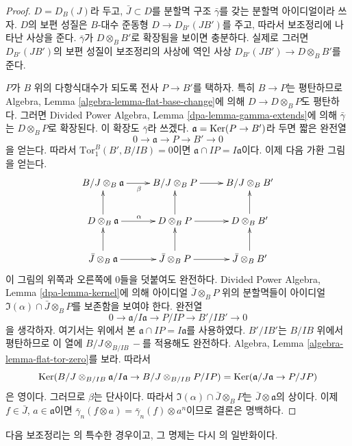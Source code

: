 \begin{proof}
$D = D_B(J)$라 두고, $\bar J \subset D$를 분할멱 구조
$\bar\gamma$를 갖는 분할멱 아이디얼이라 쓰자. $D$의 보편 성질은
$B$-대수 준동형 $D \to D_{B'}(JB')$를 주고, 따라서 보조정리에 나타난
사상을 준다. $\bar\gamma$가 $D \otimes_B B'$로 확장됨을 보이면 충분하다.
실제로 그러면 $D_{B'}(JB')$의 보편 성질이 보조정리의 사상에 역인 사상
$D_{B'}(JB') \to D \otimes_B B'$를 준다.

\medskip\noindent
$P$가 $B$ 위의 다항식대수가 되도록 전사 $P \to B'$를 택하자.
특히 $B \to P$는 평탄하므로 Algebra, Lemma
\ref{algebra-lemma-flat-base-change}에 의해
$D \to D \otimes_B P$도 평탄하다.
그러면 Divided Power Algebra, Lemma \ref{dpa-lemma-gamma-extends}에 의해
$\bar\gamma$는 $D \otimes_B P$로 확장된다. 이 확장도
$\bar\gamma$라 쓰겠다. $\mathfrak a = \mathop{\mathrm{Ker}}(P \to B')$라 두면
짧은 완전열
$$
0 \to \mathfrak a \to P \to B' \to 0
$$
을 얻는다. 따라서 $\text{Tor}_1^B(B', B/IB) = 0$이면
$\mathfrak a \cap IP = I\mathfrak a$이다.
이제 다음 가환 그림을 얻는다.
$$
\xymatrix{
B/J \otimes_B \mathfrak a \ar[r]_\beta &
B/J \otimes_B P \ar[r] &
B/J \otimes_B B' \\
D \otimes_B \mathfrak a \ar[r]^\alpha \ar[u] &
D \otimes_B P \ar[r] \ar[u] &
D \otimes_B B' \ar[u] \\
\bar J \otimes_B \mathfrak a \ar[r] \ar[u] &
\bar J \otimes_B P \ar[r] \ar[u] &
\bar J \otimes_B B' \ar[u]
}
$$
이 그림의 위쪽과 오른쪽에 $0$들을 덧붙여도 완전하다.
Divided Power Algebra, Lemma \ref{dpa-lemma-kernel}에 의해
아이디얼 $\bar J \otimes_B P$ 위의 분할멱들이 아이디얼
$\Im(\alpha) \cap \bar J \otimes_B P$를 보존함을 보여야 한다.
완전열
$$
0 \to \mathfrak a/I\mathfrak a \to P/IP \to B'/IB' \to 0
$$
을 생각하자. 여기서는 위에서 본 $\mathfrak a \cap IP = I\mathfrak a$를
사용하였다. $B'/IB'$는 $B/IB$ 위에서 평탄하므로 이 열에
$B/J \otimes_{B/IB} -$를 적용해도 완전하다. Algebra, Lemma
\ref{algebra-lemma-flat-tor-zero}를 보라. 따라서
$$
\mathop{\mathrm{Ker}}(B/J \otimes_{B/IB} \mathfrak a/I\mathfrak a \to
B/J \otimes_{B/IB} P/IP) =
\mathop{\mathrm{Ker}}(\mathfrak a/J\mathfrak a \to P/JP)
$$
은 영이다. 그러므로 $\beta$는 단사이다. 따라서
$\Im(\alpha) \cap \bar J \otimes_B P$는
$\bar J \otimes \mathfrak a$의 상이다. 이제
$f \in \bar J$, $a \in \mathfrak a$이면
$\bar\gamma_n(f \otimes a) = \bar\gamma_n(f) \otimes a^n$이므로
결론은 명백하다.
\end{proof}

\noindent
다음 보조정리는 \cite[Proposition 2.1.7]{dJ-crystalline}의 특수한 경우이고,
그 명제는 다시 \cite[Proposition 2.8.2]{Berthelot}의 일반화이다.

